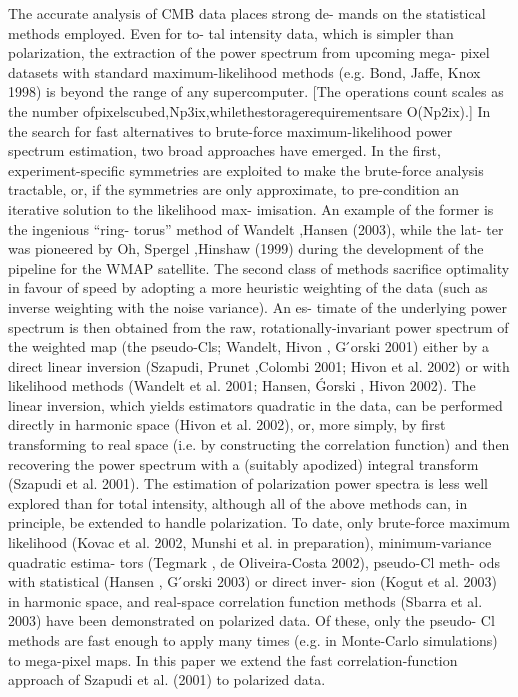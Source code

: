 \documentclass[a4paper, 11pt]{article}
\begin{document}
The accurate analysis of CMB data places strong de- mands on the statistical methods employed. Even for to- tal intensity data, which is simpler than polarization, the extraction of the power spectrum from upcoming mega- pixel datasets with standard maximum-likelihood methods (e.g. Bond, Jaffe, Knox 1998) is beyond the range of any supercomputer. [The operations count scales as the number ofpixelscubed,Np3ix,whilethestoragerequirementsare O(Np2ix).] In the search for fast alternatives to brute-force maximum-likelihood power spectrum estimation, two broad approaches have emerged. In the first, experiment-specific symmetries are exploited to make the brute-force analysis tractable, or, if the symmetries are only approximate, to pre-condition an iterative solution to the likelihood max- imisation. An example of the former is the ingenious “ring- torus” method of Wandelt ,Hansen (2003), while the lat- ter was pioneered by Oh, Spergel ,Hinshaw (1999) during the development of the pipeline for the WMAP satellite. The second class of methods sacrifice optimality in favour of speed by adopting a more heuristic weighting of the data (such as inverse weighting with the noise variance). An es- timate of the underlying power spectrum is then obtained from the raw, rotationally-invariant power spectrum of the weighted map (the pseudo-Cls; Wandelt, Hivon , G ́orski 2001) either by a direct linear inversion (Szapudi, Prunet ,Colombi 2001; Hivon et al. 2002) or with likelihood methods (Wandelt et al. 2001; Hansen, Ǵorski , Hivon 2002). The linear inversion, which yields estimators quadratic in the data, can be performed directly in harmonic space (Hivon et al. 2002), or, more simply, by first transforming to real space (i.e. by constructing the correlation function) and then recovering the power spectrum with a (suitably apodized) integral transform (Szapudi et al. 2001). The estimation of polarization power spectra is less well explored than for total intensity, although all of the above methods can, in principle, be extended to handle polarization. To date, only brute-force maximum likelihood (Kovac et al. 2002, Munshi et al. in preparation), minimum-variance quadratic estima- tors (Tegmark , de Oliveira-Costa 2002), pseudo-Cl meth- ods with statistical (Hansen , G ́orski 2003) or direct inver- sion (Kogut et al. 2003) in harmonic space, and real-space correlation function methods (Sbarra et al. 2003) have been demonstrated on polarized data. Of these, only the pseudo- Cl methods are fast enough to apply many times (e.g. in Monte-Carlo simulations) to mega-pixel maps. In this paper we extend the fast correlation-function approach of Szapudi et al. (2001) to polarized data.
\end{document}
